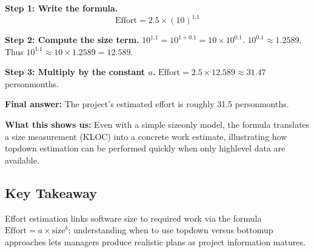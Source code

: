 \documentclass[12pt, a4paper]{article}
\begin{document}
\textbf{Step 1: Write the formula.}  
\[
\mbox{Effort}= 2.5\times (10)^{1.1}
\]

\textbf{Step 2: Compute the size term.}  
\(10^{1.1}=10^{1+0.1}=10\times10^{0.1}\).  
\(10^{0.1}\approx1.2589\).  
Thus \(10^{1.1}\approx10\times1.2589=12.589\).

\textbf{Step 3: Multiply by the constant \(a\).}  
\(\mbox{Effort}=2.5\times12.589\approx31.47\) personmonths.

\textbf{Final answer:}  The project's estimated effort is roughly 31.5 personmonths.

\textbf{What this shows us:}  Even with a simple sizeonly model, the formula translates a size measurement (KLOC) into a concrete work estimate, illustrating how topdown estimation can be performed quickly when only highlevel data are available.

\subsection{Key Takeaway}
Effort estimation links software size to required work via the formula \(\mbox{Effort}=a\times\mbox{size}^{b}\); understanding when to use topdown versus bottomup approaches lets managers produce realistic plans as project information matures.
\end{document}
